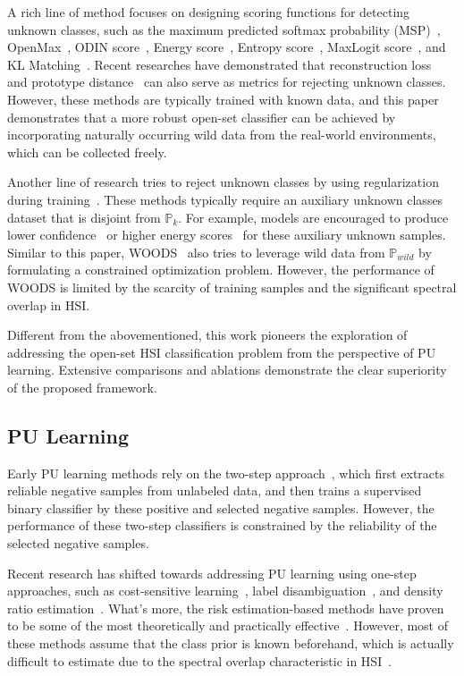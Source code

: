 A rich line of method focuses on designing scoring functions for detecting unknown classes, such as the maximum predicted softmax probability (MSP)~\cite{MSP}, OpenMax~\cite{OpenMax}, ODIN score~\cite{ODIN}, Energy score~\cite{Energy}, Entropy score~\cite{Entropy}, MaxLogit score~\cite{KLMatching}, and KL Matching~\cite{KLMatching}. Recent researches have demonstrated that reconstruction loss~\cite{8953952,MDL4OW,Fang_OpenSet} and prototype distance~\cite{Kang_OpenSet,9296325,CACLoss,10415443} can also serve as metrics for rejecting unknown classes. However, these methods are typically trained with known data, and this paper demonstrates that a more robust open-set classifier can be achieved by incorporating naturally occurring wild data from the real-world environments, which can be collected freely.

Another line of research tries to reject unknown classes by using regularization during training~\cite{OE,EOS,Energy,Entropy,WOODS}. These methods typically require an auxiliary unknown classes dataset that is disjoint from $\mathbb{P}_{k}$. For example, models are encouraged to produce lower confidence~\cite{OE,Entropy} or higher energy scores~\cite{Energy} for these auxiliary unknown samples. Similar to this paper, WOODS~\cite{WOODS} also tries to leverage wild data from $\mathbb{P}_{wild}$ by formulating a constrained optimization problem. However, the performance of WOODS is limited by the scarcity of training samples and the significant spectral overlap in HSI.

Different from the abovementioned, this work pioneers the exploration of addressing the open-set HSI classification problem from the perspective of PU learning. Extensive comparisons and ablations demonstrate the clear superiority of the proposed framework.

\subsection{PU Learning}

Early PU learning methods rely on the two-step approach~\cite{FOODY20061,Gong_Wang_Ye_Xu_Lin_2018}, which first extracts reliable negative samples from unlabeled data, and then trains a supervised binary classifier by these positive and selected negative samples. However, the performance of these two-step classifiers is constrained by the reliability of the selected negative samples.

Recent research has shifted towards addressing PU learning using one-step approaches, such as cost-sensitive learning~\cite{9201373,LU2021112584}, label disambiguation~\cite{ijcai2019p590}, and density ratio estimation~\cite{kato2018learning}. What's more, the risk estimation-based methods have proven to be some of the most theoretically and practically effective~\cite{nnPU,ITreeDet,LI2022102947,HOneCls,PUET,DistPU}. However, most of these methods assume that the class prior is known beforehand, which is actually difficult to estimate due to the spectral overlap characteristic in HSI~\cite{T-HOneCls}.


